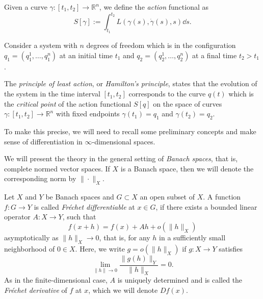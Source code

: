 \documentclass[english,fontsize=11pt,paper=b5]{scrbook}
\theoremstyle{definition}
\newcommand{\emphidx}[1]{\index{#1}\emph{#1}}
\begin{document}
  Given a curve $\gamma:[t_1, t_2] \to \mathbb{R}^n$, we define the \emphidx{action} functional as
  \begin{equation}\label{eq:Laction}
    S[\gamma] := \int_{t_1}^{t_2} L(\gamma(s), \dot \gamma(s), s) \dd s.
  \end{equation}

  \begin{tcolorbox}[title=Principle of least action]
    Consider a system with $n$ degrees of freedom which is in the configuration $q_1 = (q_1^1, \ldots, q_1^n)$ at an initial time $t_1$ and $q_2 = (q_2^1, \ldots, q_2^n)$ at a final time $t_2 > t_1$.

    The \emph{principle of least action}, or \emph{Hamilton's principle}, states that the evolution of the system in the time interval $[t_1, t_2]$ corresponds to the curve $q(t)$ which is the \emph{critical point} of the action functional $S[q]$ on the space of curves $\gamma:[t_1, t_2] \to \mathbb{R}^n$ with fixed endpoints $\gamma(t_1) = q_1$ and $\gamma(t_2) = q_2$.
  \end{tcolorbox}

  To make this precise, we will need to recall some preliminary concepts and make sense of differentiation in $\infty$-dimensional spaces.\medskip

  We will present the theory in the general setting of \emphidx{Banach spaces}, that is, complete normed vector spaces. If $X$ is a Banach space, then we will denote the corresponding norm by $\|\cdot\|_X$.

  Let $X$ and $Y$ be Banach spaces and $G\subset X$ an open subset of $X$.
  A function $f: G \to Y$ is called \emph{Fr\'echet differentiable}  at $x\in G$, if there exists a bounded linear operator $A: X \to Y$, such that
  \begin{equation}\label{eq:frechetdiff}
    f(x+h) = f(x) + Ah + o(\|h\|_X)
  \end{equation}
  asymptotically as $\|h\|_X\to 0$, that is, for any $h$ in a sufficiently small neighborhood of $0\in X$.
  Here, we write $g = o(\|h\|_X)$ if $g : X \to Y$ satisfies
    \begin{equation}
      \lim_{\|h\| \to 0} \frac{\|g(h)\|_Y}{\|h\|_X} = 0.
    \end{equation}
  As in the finite-dimensional case, $A$ is uniquely determined and is called the \emph{Fr\'echet derivative}  of $f$ at $x$, which we will denote $D f(x)$.
\end{document}
